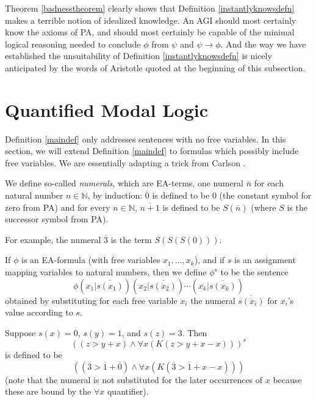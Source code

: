 \documentclass[runningheads]{llncs}
\begin{document}
Theorem \ref{badnesstheorem} clearly shows that Definition \ref{instantlyknowsdefn}
makes a terrible notion of idealized knowledge. An AGI should most certainly
know the axioms of PA, and should most certainly be capable of the
minimal logical reasoning needed to conclude $\phi$ from $\psi$ and $\psi\rightarrow\phi$.
And the way we have established the unsuitability of Definition \ref{instantlyknowsdefn}
is nicely anticipated by the words of Aristotle quoted at the beginning of this subsection.



\section{Quantified Modal Logic}
\label{quantifiedsection}

Definition \ref{maindef} only addresses sentences with no free variables.
In this section, we will extend Definition \ref{maindef} to formulas which possibly include
free variables. We are essentially adapting a trick from
Carlson \cite{carlson}.

\begin{definition}
  We define so-called \emph{numerals}, which
  are EA-terms, one numeral $\overline n$ for each natural number $n\in\mathbb N$,
  by induction: $\overline 0$ is defined to be $0$ (the constant symbol for zero from
  PA) and
  for every $n\in\mathbb N$, $\overline{n+1}$ is defined to be $S(\overline n)$
  (where $S$ is the successor symbol from PA).
\end{definition}

For example, the numeral $\overline 3$ is the term $S(S(S(0)))$.

\begin{definition}
\label{superscript_s_defn}
  If $\phi$ is an EA-formula (with free variables
  $x_1,\ldots,x_k$),
  and if $s$ is an assignment mapping variables to natural numbers, then we define $\phi^s$
  to be the sentence
  \[
    \phi(x_1|\overline{s(x_1)})(x_2|\overline{s(x_2)})\cdots (x_k|\overline{s(x_k)})
  \]
  obtained by substituting for each free variable $x_i$ the numeral $\overline{s(x_i)}$
  for $x_i$'s value according to $s$.
\end{definition}

\begin{example}
  Suppose $s(x)=0$, $s(y)=1$, and $s(z)=3$. Then
  \[
  ((z>y+x) \wedge \forall x(K(z>y+x-x)))^s
  \]
  is defined to be
  \[
  ((\overline 3 > \overline 1+\overline 0)
  \wedge \forall x( K( \overline 3 > \overline 1 + x - x ) ))
  \]
  (note that the numeral is not substituted for the later occurrences of $x$ because
  these are bound by the $\forall x$ quantifier).
\end{example}
\end{document}
